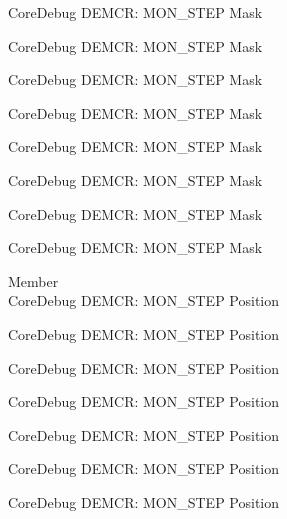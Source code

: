 \begin{DoxyRefList}
\label{deprecated__deprecated000501}%
%
Core\+Debug DEMCR\+: MON\+\_\+\+STEP Mask 

\label{deprecated__deprecated000603}%
%
Core\+Debug DEMCR\+: MON\+\_\+\+STEP Mask 

\label{deprecated__deprecated000709}%
%
Core\+Debug DEMCR\+: MON\+\_\+\+STEP Mask 

\label{deprecated__deprecated000853}%
%
Core\+Debug DEMCR\+: MON\+\_\+\+STEP Mask 

\label{deprecated__deprecated000995}%
%
Core\+Debug DEMCR\+: MON\+\_\+\+STEP Mask 

\label{deprecated__deprecated001071}%
%
Core\+Debug DEMCR\+: MON\+\_\+\+STEP Mask 

\label{deprecated__deprecated001160}%
%
Core\+Debug DEMCR\+: MON\+\_\+\+STEP Mask 

\label{deprecated__deprecated001262}%
%
Core\+Debug DEMCR\+: MON\+\_\+\+STEP Mask  
\item[Member \doxylink{group___c_m_s_i_s___core_debug_ga9ae10710684e14a1a534e785ef390e1b}{Core\+Debug\+\_\+\+DEMCR\+\_\+\+MON\+\_\+\+STEP\+\_\+\+Pos} ]\hfill \\
\label{deprecated__deprecated000049}%
%
Core\+Debug DEMCR\+: MON\+\_\+\+STEP Position 

\label{deprecated__deprecated000193}%
%
Core\+Debug DEMCR\+: MON\+\_\+\+STEP Position 

\label{deprecated__deprecated000335}%
%
Core\+Debug DEMCR\+: MON\+\_\+\+STEP Position 

\label{deprecated__deprecated000411}%
%
Core\+Debug DEMCR\+: MON\+\_\+\+STEP Position 

\label{deprecated__deprecated000500}%
%
Core\+Debug DEMCR\+: MON\+\_\+\+STEP Position 

\label{deprecated__deprecated000602}%
%
Core\+Debug DEMCR\+: MON\+\_\+\+STEP Position 

\label{deprecated__deprecated000708}%
%
Core\+Debug DEMCR\+: MON\+\_\+\+STEP Position 


\end{DoxyRefList}

